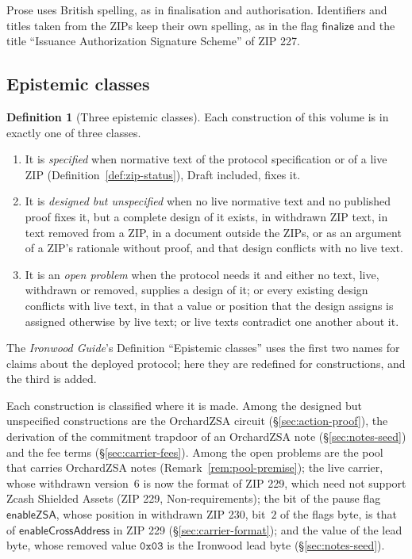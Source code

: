 \documentclass[11pt,a4paper]{article}
\theoremstyle{definition}
\newtheorem{definition}[theorem]{Definition}
\begin{document}
Prose uses British spelling, as in finalisation and authorisation.
Identifiers and titles taken from the ZIPs keep their own spelling, as in
the flag $\mathsf{finalize}$ and the title ``Issuance Authorization
Signature Scheme'' of ZIP 227.

\FloatBarrier
\subsection{Epistemic classes}\label{sec:intro-classes}

\begin{definition}[Three epistemic classes]\label{def:classes}
Each construction of this volume is in exactly one of three classes.
\begin{enumerate}[label=(\roman*)]
\item It is \emph{specified} when normative text of the protocol
  specification or of a live ZIP (Definition~\ref{def:zip-status}), Draft
  included, fixes it.
\item It is \emph{designed but unspecified} when no live normative text and
  no published proof fixes it, but a complete design of it exists, in
  withdrawn ZIP text, in text removed from a ZIP, in a document outside the
  ZIPs, or as an argument of a ZIP's rationale without proof, and that
  design conflicts with no live text.
\item It is an \emph{open problem} when the protocol needs it and either no
  text, live, withdrawn or removed, supplies a design of it; or every
  existing design conflicts with live text, in that a value or position that
  the design assigns is assigned otherwise by live text; or live texts
  contradict one another about it.
\end{enumerate}
The \emph{Ironwood Guide}'s Definition ``Epistemic classes'' uses the first
two names for claims about the deployed protocol; here they are redefined
for constructions, and the third is added.
\end{definition}

Each construction is classified where it is made. Among the designed but
unspecified constructions are the OrchardZSA circuit
(\S\ref{sec:action-proof}), the derivation of the commitment trapdoor of an
OrchardZSA note (\S\ref{sec:notes-seed}) and the fee terms
(\S\ref{sec:carrier-fees}). Among the open problems are the pool that
carries OrchardZSA notes (Remark~\ref{rem:pool-premise}); the live carrier,
whose withdrawn version~$6$ is now the format of ZIP 229, which need not
support Zcash Shielded Assets (ZIP 229, Non-requirements); the bit of the
pause flag $\mathsf{enableZSA}$, whose position in withdrawn ZIP 230, bit~$2$
of the flags byte, is that of $\mathsf{enableCrossAddress}$ in ZIP 229
(\S\ref{sec:carrier-format}); and the value of
the lead byte, whose removed value $\mathtt{0x03}$ is the Ironwood lead byte
(\S\ref{sec:notes-seed}).
\end{document}
